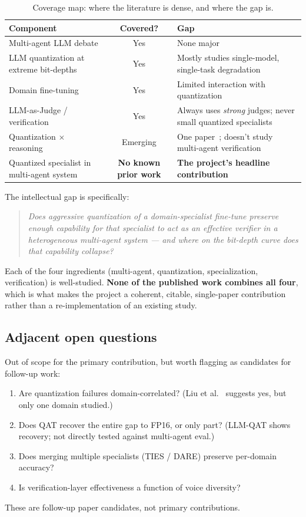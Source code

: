 \documentclass[11pt]{article}
\begin{document}
\begin{table}[ht]
\centering
\small
\begin{tabularx}{\textwidth}{l c X}
\toprule
\textbf{Component} & \textbf{Covered?} & \textbf{Gap} \\
\midrule
Multi-agent LLM debate & Yes & None major \\
LLM quantization at extreme bit-depths & Yes & Mostly studies single-model, single-task degradation \\
Domain fine-tuning & Yes & Limited interaction with quantization \\
LLM-as-Judge / verification & Yes & Always uses \emph{strong} judges; never small quantized specialists \\
Quantization $\times$ reasoning & Emerging & One paper~\cite{liu2025quantmeetsreasoning}; doesn't study multi-agent verification \\
Quantized specialist in multi-agent system & \textbf{No known prior work} & \textbf{The project's headline contribution} \\
\bottomrule
\end{tabularx}
\caption{Coverage map: where the literature is dense, and where the gap is.}
\end{table}

The intellectual gap is specifically:

\begin{quote}
\itshape Does aggressive quantization of a domain-specialist fine-tune preserve enough capability for that specialist to act as an effective verifier in a heterogeneous multi-agent system --- and where on the bit-depth curve does that capability collapse?
\end{quote}

Each of the four ingredients (multi-agent, quantization, specialization, verification) is well-studied. \textbf{None of the published work combines all four}, which is what makes the project a coherent, citable, single-paper contribution rather than a re-implementation of an existing study.

\subsection*{Adjacent open questions}

Out of scope for the primary contribution, but worth flagging as candidates for follow-up work:

\begin{enumerate}
  \item Are quantization failures domain-correlated? (Liu et al.~\cite{liu2025quantmeetsreasoning} suggests yes, but only one domain studied.)
  \item Does QAT recover the entire gap to FP16, or only part? (LLM-QAT shows recovery; not directly tested against multi-agent eval.)
  \item Does merging multiple specialists (TIES / DARE) preserve per-domain accuracy?
  \item Is verification-layer effectiveness a function of voice diversity?
\end{enumerate}

These are follow-up paper candidates, not primary contributions.

\printbibliography[heading=bibnumbered, title={References}]
\end{document}
